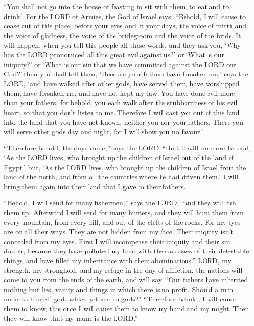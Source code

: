  ``You shall not go into the house of feasting to sit with
them, to eat and to drink.''  For the LORD of Armies, the
God of Israel says: ``Behold, I will cause to cease out of this place,
before your eyes and in your days, the voice of mirth and the voice of
gladness, the voice of the bridegroom and the voice of the bride.
 It will happen, when you tell this people all these
words, and they ask you, `Why has the LORD pronounced all this great
evil against us?' or `What is our iniquity?' or `What is our sin that we
have committed against the LORD our God?'  then you shall
tell them, `Because your fathers have forsaken me,' says the LORD, `and
have walked after other gods, have served them, have worshipped them,
have forsaken me, and have not kept my law.  You have
done evil more than your fathers, for behold, you each walk after the
stubbornness of his evil heart, so that you don't listen to me.
 Therefore I will cast you out of this land into the land
that you have not known, neither you nor your fathers. There you will
serve other gods day and night, for I will show you no favour.'

 ``Therefore behold, the days come,'' says the LORD,
``that it will no more be said, `As the LORD lives, who brought up the
children of Israel out of the land of Egypt;'  but, `As
the LORD lives, who brought up the children of Israel from the land of
the north, and from all the countries where he had driven them.' I will
bring them again into their land that I gave to their fathers.

 ``Behold, I will send for many fishermen,'' says the
LORD, ``and they will fish them up. Afterward I will send for many
hunters, and they will hunt them from every mountain, from every hill,
and out of the clefts of the rocks.  For my eyes are on
all their ways. They are not hidden from my face. Their iniquity isn't
concealed from my eyes.  First I will recompense their
iniquity and their sin double, because they have polluted my land with
the carcasses of their detestable things, and have filled my inheritance
with their abominations.''  LORD, my strength, my
stronghold, and my refuge in the day of affliction, the nations will
come to you from the ends of the earth, and will say, ``Our fathers have
inherited nothing but lies, vanity and things in which there is no
profit.  Should a man make to himself gods which yet are
no gods?''  ``Therefore behold, I will cause them to
know, this once I will cause them to know my hand and my might. Then
they will know that my name is the LORD.''


